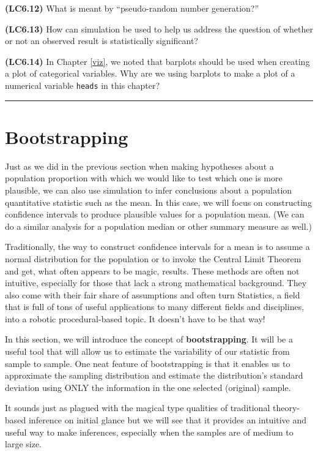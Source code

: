 \documentclass[]{tufte-book}
\begin{document}
\textbf{(LC6.12)} What is meant by ``pseudo-random number generation?''

\textbf{(LC6.13)} How can simulation be used to help us address the
question of whether or not an observed result is statistically
significant?

\textbf{(LC6.14)} In Chapter \ref{viz}, we noted that barplots should be
used when creating a plot of categorical variables. Why are we using
barplots to make a plot of a numerical variable \texttt{heads} in this
chapter?

\begin{center}\rule{\linewidth}{\linethickness}\end{center}

\section{Bootstrapping}\label{bootstrapping}

Just as we did in the previous section when making hypotheses about a
population proportion with which we would like to test which one is more
plausible, we can also use simulation to infer conclusions about a
population quantitative statistic such as the mean. In this case, we
will focus on constructing confidence intervals to produce plausible
values for a population mean. (We can do a similar analysis for a
population median or other summary measure as well.)

Traditionally, the way to construct confidence intervals for a mean is
to assume a normal distribution for the population or to invoke the
Central Limit Theorem and get, what often appears to be magic, results.
These methods are often not intuitive, especially for those that lack a
strong mathematical background. They also come with their fair share of
assumptions and often turn Statistics, a field that is full of tons of
useful applications to many different fields and disciplines, into a
robotic procedural-based topic. It doesn't have to be that way!

In this section, we will introduce the concept of
\textbf{bootstrapping}. It will be a useful tool that will allow us to
estimate the variability of our statistic from sample to sample. One
neat feature of bootstrapping is that it enables us to approximate the
sampling distribution and estimate the distribution's standard deviation
using ONLY the information in the one selected (original) sample.

It sounds just as plagued with the magical type qualities of traditional
theory-based inference on initial glance but we will see that it
provides an intuitive and useful way to make inferences, especially when
the samples are of medium to large size.
\end{document}
